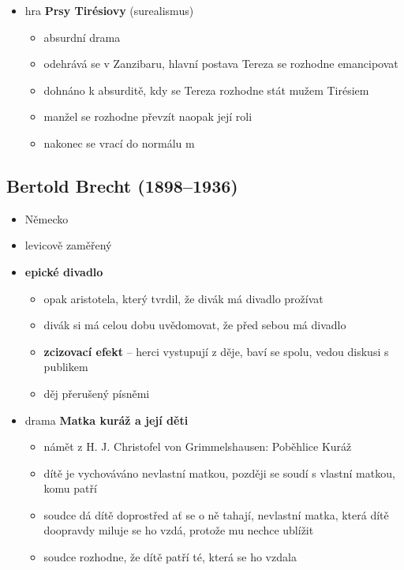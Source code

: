 \begin{itemize}
\begin{itemize}
	\end{itemize}
\item hra \textbf{Prsy Tirésiovy} (surealismus)
	\begin{itemize}
	\item absurdní drama
	\item odehrává se v Zanzibaru, hlavní postava Tereza se rozhodne emancipovat
	\item dohnáno k absurditě, kdy se Tereza rozhodne stát mužem Tirésiem
	\item manžel se rozhodne převzít naopak její roli
	\item nakonec se vrací do normálu  m
	\end{itemize}
\end{itemize}

\subsection{Bertold Brecht (1898--1936)}
\begin{itemize}
\item Německo
\item levicově zaměřený
\item \textbf{epické divadlo} 
	\begin{itemize}
	\item opak aristotela, který tvrdil, že divák má divadlo prožívat
	\item divák si má celou dobu uvědomovat, že před sebou má divadlo
	\item \textbf{zcizovací efekt} -- herci vystupují z děje, baví se spolu, vedou diskusi s publikem
	\item děj přerušený písněmi
	\end{itemize}
\item drama \textbf{Matka kuráž a její děti}
	\begin{itemize}
	\item námět z H. J. Christofel von Grimmelshausen: Poběhlice Kuráž
	\item dítě je vychováváno nevlastní matkou, později se soudí s vlastní matkou, komu patří
	\item soudce dá dítě doprostřed ať se o ně tahají, nevlastní matka, která dítě doopravdy miluje se ho vzdá, protože mu nechce ublížit
	\item soudce rozhodne, že dítě patří té, která se ho vzdala
	\end{itemize}
\end{itemize}

